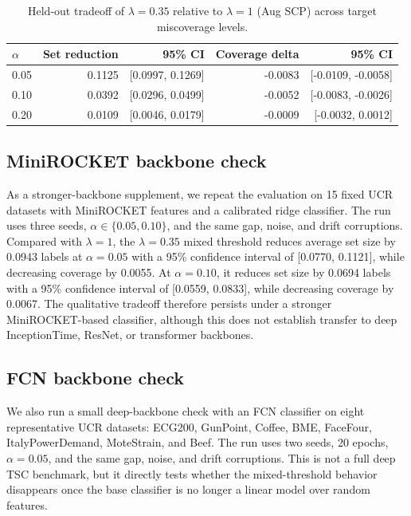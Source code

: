 \begin{table}[t]
\centering
\small
\caption{Held-out tradeoff of $\lambda=0.35$ relative to $\lambda=1$ (Aug SCP) across target miscoverage levels.}
\label{tab:lambda_tradeoff}
\begin{tabular}{lrrrr}
\toprule
$\alpha$ & Set reduction & 95\% CI & Coverage delta & 95\% CI \\
\midrule
0.05 & 0.1125 & [0.0997, 0.1269] & -0.0083 & [-0.0109, -0.0058] \\
0.10 & 0.0392 & [0.0296, 0.0499] & -0.0052 & [-0.0083, -0.0026] \\
0.20 & 0.0109 & [0.0046, 0.0179] & -0.0009 & [-0.0032, 0.0012] \\
\bottomrule
\end{tabular}
\end{table}

\subsection{MiniROCKET backbone check}

As a stronger-backbone supplement, we repeat the evaluation on 15 fixed UCR datasets with MiniROCKET features and a calibrated ridge classifier. The run uses three seeds, $\alpha\in\{0.05,0.10\}$, and the same gap, noise, and drift corruptions. Compared with $\lambda=1$, the $\lambda=0.35$ mixed threshold reduces average set size by 0.0943 labels at $\alpha=0.05$ with a 95\% confidence interval of [0.0770, 0.1121], while decreasing coverage by 0.0055. At $\alpha=0.10$, it reduces set size by 0.0694 labels with a 95\% confidence interval of [0.0559, 0.0833], while decreasing coverage by 0.0067. The qualitative tradeoff therefore persists under a stronger MiniROCKET-based classifier, although this does not establish transfer to deep InceptionTime, ResNet, or transformer backbones.

\subsection{FCN backbone check}

We also run a small deep-backbone check with an FCN classifier on eight representative UCR datasets: ECG200, GunPoint, Coffee, BME, FaceFour, ItalyPowerDemand, MoteStrain, and Beef. The run uses two seeds, 20 epochs, $\alpha=0.05$, and the same gap, noise, and drift corruptions. This is not a full deep TSC benchmark, but it directly tests whether the mixed-threshold behavior disappears once the base classifier is no longer a linear model over random features.

